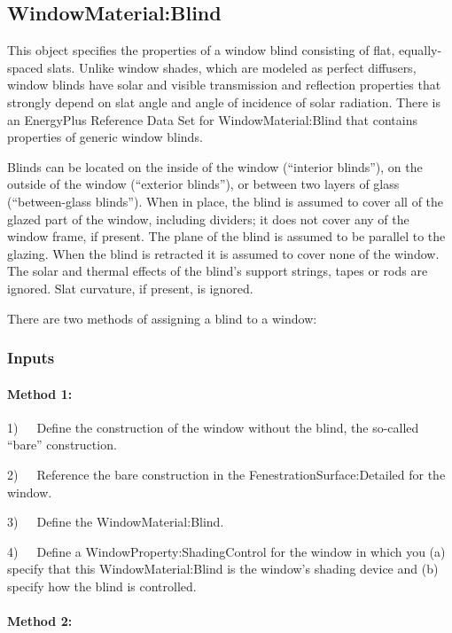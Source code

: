 \subsection{WindowMaterial:Blind}\label{windowmaterialblind}

This object specifies the properties of a window blind consisting of flat, equally-spaced slats. Unlike window shades, which are modeled as perfect diffusers, window blinds have solar and visible transmission and reflection properties that strongly depend on slat angle and angle of incidence of solar radiation. There is an EnergyPlus Reference Data Set for WindowMaterial:Blind that contains properties of generic window blinds.

Blinds can be located on the inside of the window (``interior blinds''), on the outside of the window (``exterior blinds''), or between two layers of glass (``between-glass blinds''). When in place, the blind is assumed to cover all of the glazed part of the window, including dividers; it does not cover any of the window frame, if present. The plane of the blind is assumed to be parallel to the glazing. When the blind is retracted it is assumed to cover none of the window. The solar and thermal effects of the blind's support strings, tapes or rods are ignored. Slat curvature, if present, is ignored.

There are two methods of assigning a blind to a window:

\subsubsection{Inputs}\label{inputs-23-005}

\paragraph{Method 1:}\label{method-1-1}

1)~~~Define the construction of the window without the blind, the so-called ``bare'' construction.

2)~~~Reference the bare construction in the FenestrationSurface:Detailed for the window.

3)~~~Define the WindowMaterial:Blind.

4)~~~Define a WindowProperty:ShadingControl for the window in which you (a) specify that this WindowMaterial:Blind is the window's shading device and (b) specify how the blind is controlled.

\paragraph{Method 2:}\label{method-2-1}

